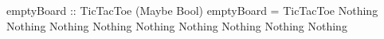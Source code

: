 \begin{code}
emptyBoard :: TicTacToe (Maybe Bool)
emptyBoard =
  TicTacToe
    Nothing Nothing Nothing
    Nothing Nothing Nothing
    Nothing Nothing Nothing
\end{code}
